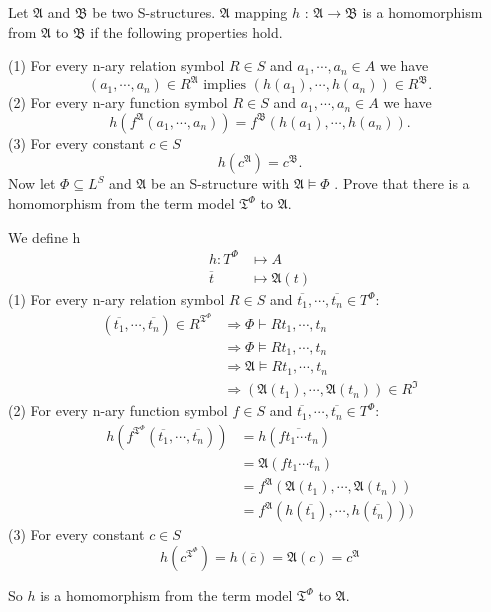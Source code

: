 \documentclass{ximera}
\begin{document}
\begin{problem}
    Let $\mathfrak{A}$ and $\mathfrak{B}$ be two S-structures. 
    $\mathfrak{A}$ mapping $h$ : $\mathfrak{A} \rightarrow \mathfrak{B}$ 
    is a homomorphism from $\mathfrak{A}$ to $\mathfrak{B}$ if the following properties hold.

    (1) For every n-ary relation symbol $R \in S$ and $a_1, \cdots, a_n \in A$ we have
    $$
    (a_1,\cdots , a_n) \in R^{\mathfrak{A}} \text{ implies } (h(a_1),  \cdots , h(a_n)) \in R^\mathfrak{B}.
    $$
    (2) For every n-ary function symbol $R \in S$ and $a_1, \cdots , a_n \in A$ we have
    $$
    h(f^\mathfrak{A}(a_1,\cdots, a_n)) = f^\mathfrak{B}(h(a_1), \cdots, h(a_n)).
    $$
    (3) For every constant $c \in S$
    $$
    h(c^{\mathfrak{A}}) = c^{\mathfrak{B}}.
    $$
    Now let $\Phi \subseteq L^S$ and $\mathfrak{A}$ be an S-structure with $\mathfrak{A} \models \Phi$
    . Prove that there is a homomorphism from the term model $\mathfrak{T}^{\Phi}$ to $\mathfrak{A}$. 
    \begin{solution}
        We define h
        $$
        \begin{aligned}
            h: T^{\Phi} &\mapsto A \\
               \overline{t} &\mapsto \mathfrak{A}(t)
        \end{aligned}
        $$
        (1) For every n-ary relation symbol $R \in S$ and $\overline{t_1}, \cdots, \overline{t_n} \in T^{\Phi}$:
        $$
        \begin{aligned}
            (\overline{t_1},\cdots,\overline{t_n}) \in R^{\mathfrak{T}^{\Phi}} 
            &\Rightarrow \Phi \vdash Rt_1,\cdots,t_n\\
            &\Rightarrow \Phi \models Rt_1,\cdots,t_n\\
            &\Rightarrow \mathfrak{A} \models Rt_1,\cdots,t_n \\
            &\Rightarrow (\mathfrak{A}(t_1),\cdots,\mathfrak{A}(t_n)) \in R^{\mathfrak{I}}
        \end{aligned}
        $$
        (2) For every n-ary function symbol $f \in S$ and $\overline{t_1}, \cdots, \overline{t_n} \in T^{\Phi}$:
        $$
        \begin{aligned}
            h(f^{\mathfrak{T}^\Phi}(\overline{t_1},\cdots,\overline{t_n}))
            &= h(\overline{f t_1\cdots t_n}) \\
            &= \mathfrak{A}(f t_1\cdots t_n) \\
            &= f^{\mathfrak{A}}(\mathfrak{A}(t_1),\cdots,\mathfrak{A}(t_n)) \\
            &= f^{\mathfrak{A}}(h(\overline{t_1}),\cdots, h(\overline{t_n})))
        \end{aligned}
        $$
        (3) For every constant $c \in S$
        $$h(c^{\mathfrak{T}^{\Phi}})=h(\overline{c})=\mathfrak{A}(c)=c^{\mathfrak{A}}$$

        So $h$ is a homomorphism from the term model $\mathfrak{T}^{\Phi}$ to $\mathfrak{A}$. 
    \end{solution}
\end{problem}
\end{document}
